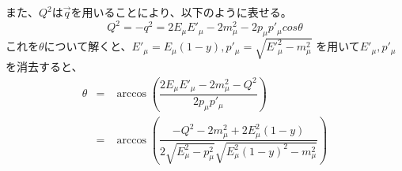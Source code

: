 また、$Q^2$は$\vec{q}$を用いることにより、以下のように表せる。
\begin{equation}
    Q^2 = -q^2 = 2E_\mu E'_\mu -2m^2_\mu-2p_\mu p'_\mu cos\theta
\end{equation}
これを$\theta$について解くと、$E'_\mu = E_\mu(1-y), p'_\mu = \sqrt{E'^2_\mu - m^2_\mu}$
を用いて$E'_\mu, p'_\mu$を消去すると、
\begin{eqnarray}
    \theta & = &\arccos{(\dfrac {2E_\mu E'_\mu -2m^2_\mu-Q^2}{2p_\mu p'_\mu})} \\
    & = & \arccos{(\dfrac{-Q^2-2m^2_\mu+2E^2_\mu(1-y)}{2\sqrt{E^2_\mu-p^2_\mu}\sqrt{E^2_\mu(1-y)^2-m^2_\mu} } )}
\end{eqnarray}
